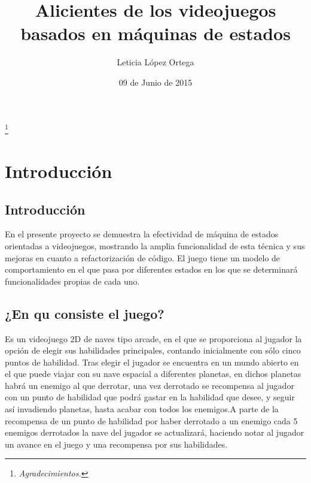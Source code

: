 \documentclass[a4paper,10pt]{article}
\begin{document}
\renewcommand{\listfigurename}{Índice de Figuras}
\renewcommand{\contentsname}{Índice de Contenidos}
\renewcommand{\figurename}{Figura}


\thispagestyle{empty} 
\title{Alicientes de los videojuegos basados en máquinas de estados}
\author{Leticia López Ortega}
\date{09 de Junio de 2015}
\maketitle
\thispagestyle{empty}
\cleardoublepage

\thispagestyle{empty} 
\begin{flushright}
 \thanks{\emph{Agradecimientos.}} %
\end{flushright}

\cleardoublepage

\thispagestyle{empty} 
\tableofcontents
\thispagestyle{empty} 
\cleardoublepage

\listoffigures
\thispagestyle{empty} 
\cleardoublepage

\setlength{\parindent}{1cm}
\parskip=3mm

\section{Introducción}

\subsection{Introducción}

En el presente proyecto se demuestra la efectividad de máquina de estados orientadas a videojuegos,
mostrando la amplia funcionalidad de esta técnica y sus mejoras en cuanto a refactorización
de código. El juego tiene un modelo de comportamiento en el que pasa por diferentes estados
en los que se determinará funcionalidades propias de cada uno.

\subsection{¿En qu consiste el juego?}

Es un videojuego 2D de naves tipo arcade, en el que se proporciona al jugador la opción de
elegir sus habilidades principales, contando inicialmente con sólo cinco puntos de habilidad.
Tras elegir el jugador se encuentra en un mundo abierto en el que puede viajar con su nave
espacial a diferentes planetas, en dichos planetas habrá un enemigo al que
derrotar, una vez derrotado se recompensa al jugador con un punto de habilidad que podrá
gastar en la habilidad que desee, y seguir así invadiendo planetas, hasta acabar con todos los
enemigos.A parte de la recompensa de un punto de habilidad por haber derrotado a un
enemigo cada 5 enemigos derrotados la nave del jugador se actualizará, haciendo notar al
jugador un avance en el juego y una recompensa por sus habilidades.
\end{document}
